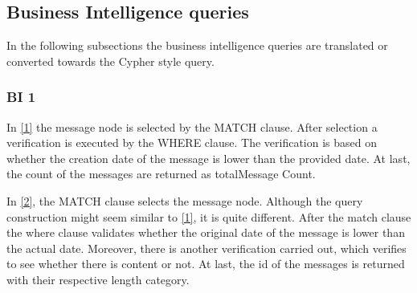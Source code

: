 \subsection{Business Intelligence queries}

In the following subsections the business intelligence queries are translated or converted towards the Cypher style query.
\subsubsection{BI 1}
\renewcommand{\listingscaption}{}


In \ref{1}  the message node is selected by the MATCH clause. After selection a verification is executed by the WHERE clause.
The verification is based on whether the creation date of the message is lower than the provided date. At last, the count of the messages are returned as totalMessage Count.



In \ref{2}, the MATCH clause selects the message node. Although the query construction might seem similar to \ref{1}, it is quite different.
After the match clause the where clause validates whether the original date of the message is lower than the actual date. Moreover, there is another verification carried out,
which verifies to see whether there is content or not. At last, the id of the messages is returned with their respective length category.


